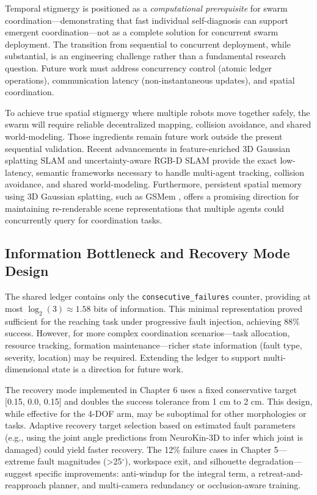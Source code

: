 \documentclass[12pt,a4paper,oneside]{report}
\begin{document}
Temporal stigmergy is positioned as a \textit{computational prerequisite} for swarm coordination---demonstrating that fast individual self-diagnosis can support emergent coordination---not as a complete solution for concurrent swarm deployment. The transition from sequential to concurrent deployment, while substantial, is an engineering challenge rather than a fundamental research question. Future work must address concurrency control (atomic ledger operations), communication latency (non-instantaneous updates), and spatial coordination. 

To achieve true spatial stigmergy where multiple robots move together safely, the swarm will require reliable decentralized mapping, collision avoidance, and shared world-modeling. Those ingredients remain future work outside the present sequential validation. Recent advancements in feature-enriched 3D Gaussian splatting SLAM \cite{thirgood2025featureslam} and uncertainty-aware RGB-D SLAM \cite{tran2025varsplat} provide the exact low-latency, semantic frameworks necessary to handle multi-agent tracking, collision avoidance, and shared world-modeling. Furthermore, persistent spatial memory using 3D Gaussian splatting, such as GSMem \cite{lu2025gsmem}, offers a promising direction for maintaining re-renderable scene representations that multiple agents could concurrently query for coordination tasks.

\subsection{Information Bottleneck and Recovery Mode Design}

The shared ledger contains only the \texttt{consecutive\_failures} counter, providing at most $\log_2(3) \approx 1.58$ bits of information. This minimal representation proved sufficient for the reaching task under progressive fault injection, achieving 88\% success. However, for more complex coordination scenarios---task allocation, resource tracking, formation maintenance---richer state information (fault type, severity, location) may be required. Extending the ledger to support multi-dimensional state is a direction for future work.

The recovery mode implemented in Chapter 6 uses a fixed conservative target [0.15, 0.0, 0.15] and doubles the success tolerance from 1 cm to 2 cm. This design, while effective for the 4-DOF arm, may be suboptimal for other morphologies or tasks. Adaptive recovery target selection based on estimated fault parameters (e.g., using the joint angle predictions from NeuroKin-3D to infer which joint is damaged) could yield faster recovery. The 12\% failure cases in Chapter 5---extreme fault magnitudes (>25$^\circ$), workspace exit, and silhouette degradation---suggest specific improvements: anti-windup for the integral term, a retreat-and-reapproach planner, and multi-camera redundancy or occlusion-aware training.
\end{document}
